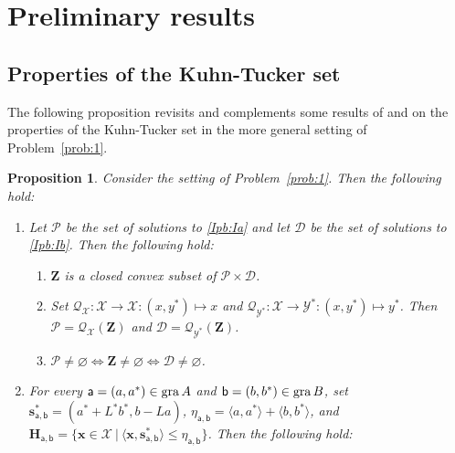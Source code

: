 \documentclass[a4paper,11pt,fleqn]{article}
\renewcommand{\leq}{\ensuremath{\leqslant}}
\newcommand{\pair}[2]{\langle{{#1},{#2}}\rangle}
\newcommand{\menge}[2]{\big\{{#1}~\big |~{#2}\big\}}
\newcommand{\XX}{\ensuremath{{\mathcal X}}}
\newcommand{\XXX}{\ensuremath{\boldsymbol{\mathcal X}}}
\newcommand{\YY}{\ensuremath{{\mathcal Y}}}
\newcommand{\emp}{\ensuremath{{\varnothing}}}
\newcommand{\gra}{\ensuremath{\text{\rm gra}\,}}
\newtheorem{proposition}[theorem]{Proposition}
\theoremstyle{plain}{\theorembodyfont{\rmfamily}%
\newtheorem{conjecture}[theorem]{Conjecture}}
\theoremstyle{plain}{\theorembodyfont{\rmfamily}%
\newtheorem{example}[theorem]{Example}}
\theoremstyle{plain}{\theorembodyfont{\rmfamily}%
\newtheorem{remark}[theorem]{Remark}}
\theoremstyle{plain}{\theorembodyfont{\rmfamily}%
\newtheorem{algorithm}[theorem]{Algorithm}}
\theoremstyle{plain}{\theorembodyfont{\rmfamily}%
\newtheorem{condition}[theorem]{Condition}}
\theoremstyle{plain}{\theorembodyfont{\rmfamily}%
\newtheorem{definition}[theorem]{Definition}}
\theoremstyle{plain}{\theorembodyfont{\rmfamily}
\newtheorem{problem}[theorem]{Problem}}
\theoremstyle{plain}{\theorembodyfont{\rmfamily}
\newtheorem{notation}[theorem]{Notation}}
\numberwithin{equation}{section}
\begin{document}
\section{Preliminary results}
\label{IVsec:II}

\subsection{Properties of the Kuhn-Tucker set}
The following proposition revisits and complements some results 
of \cite{Siop14} and \cite{Siop11} on the properties of the 
Kuhn-Tucker set in the more general setting of 
Problem~\ref{prob:1}.

\begin{proposition}
\label{ppOlk28ha12}
Consider the setting of Problem~\ref{prob:1}. Then the 
following hold:
\begin{enumerate}
\item
\label{ppOlk28ha12i}
Let $\mathscr{P}$ be the set of solutions to \eqref{Ipb:Ia} and 
let $\mathscr{D}$ be the set of solutions to \eqref{Ipb:Ib}. Then 
the following hold:
\begin{enumerate}
\item
\label{ppOlk28ha12ia}
$\boldsymbol{Z}$ is a closed convex subset of 
$\mathscr{P}\times\mathscr{D}$.
\item
\label{ppOlk28ha12ib}
Set $\mathcal{Q}_\XX\colon\XXX\to\XX\colon (x,y^*)\mapsto x$
and $\mathcal{Q}_{\YY^*}\colon\XXX\to\YY^*\colon (x,y^*)\mapsto y^*$.
Then $\mathscr{P}=\mathcal{Q}_\XX(\boldsymbol{Z})$ and 
$\mathscr{D}=\mathcal{Q}_{\YY^*}(\boldsymbol{Z})$. 
\item
\label{ppOlk28ha12ic}
$\mathscr{P}\neq\emp\Leftrightarrow\boldsymbol{Z}
\neq\emp\Leftrightarrow\mathscr{D}\neq\emp$.
\end{enumerate}
\item
\label{ppOlk28ha12ii}
For every $\mathsf{a}=(a,a^*)\in\gra A$ and 
$\mathsf{b}=(b,b^*)\in\gra B$, set
$\boldsymbol{s}_{\mathsf{a},\mathsf{b}}^*=(a^*+L^*b^*,b-La)$, 
$\eta_{\mathsf{a},\mathsf{b}}=\pair{a}{a^*}+\pair{b}{b^*}$, and 
$\boldsymbol{H}_{\mathsf{a},\mathsf{b}}=
\menge{\boldsymbol{x}\in\boldsymbol{\mathcal{X}}}
{\pair{\boldsymbol{x}}{\boldsymbol{s}_{\mathsf{a},\mathsf{b}}^*}
\leq\eta_{\mathsf{a},\mathsf{b}}}$. Then the following hold:
\begin{enumerate}
\item
\label{ppOlk28ha12iia}
$(\forall\mathsf{a}\in\gra A)(\forall\mathsf{b}\in\gra B)$ 
$[\,\boldsymbol{s}^*_{\mathsf{a},\mathsf{b}}
=\boldsymbol{0}\;\Leftrightarrow\;

\end{enumerate}
\end{enumerate}
\end{proposition}
\end{document}
